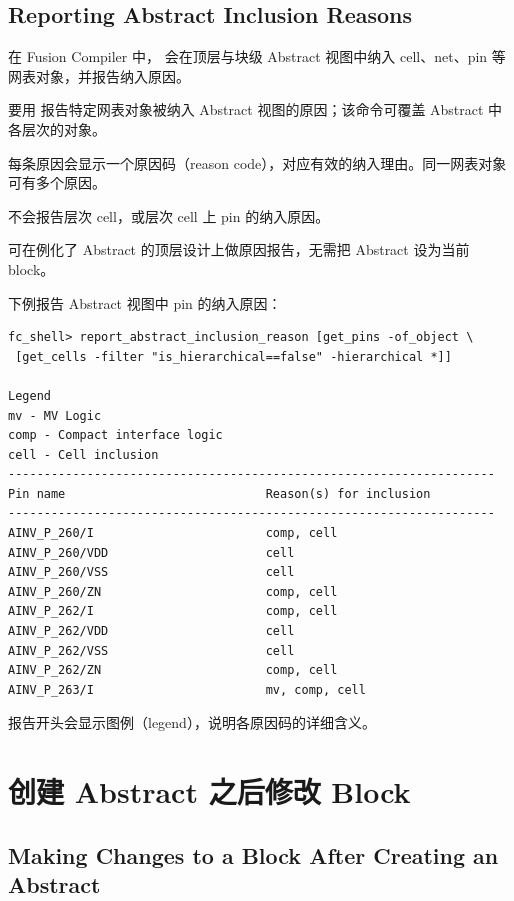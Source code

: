 \subsection*{Reporting Abstract Inclusion Reasons}

在 Fusion Compiler 中， 会在顶层与块级 Abstract 视图中纳入 cell、net、pin 等网表对象，并报告纳入原因。

要用  报告特定网表对象被纳入 Abstract 视图的原因；该命令可覆盖 Abstract 中各层次的对象。

每条原因会显示一个原因码（reason code），对应有效的纳入理由。同一网表对象可有多个原因。

\begin{noteBox}
 不会报告层次 cell，或层次 cell 上 pin 的纳入原因。
\end{noteBox}

可在例化了 Abstract 的顶层设计上做原因报告，无需把 Abstract 设为当前 block。

下例报告 Abstract 视图中 pin 的纳入原因：
\begin{lstlisting}
fc_shell> report_abstract_inclusion_reason [get_pins -of_object \
 [get_cells -filter "is_hierarchical==false" -hierarchical *]]

Legend
mv - MV Logic
comp - Compact interface logic
cell - Cell inclusion
--------------------------------------------------------------------
Pin name                            Reason(s) for inclusion
--------------------------------------------------------------------
AINV_P_260/I                        comp, cell
AINV_P_260/VDD                      cell
AINV_P_260/VSS                      cell
AINV_P_260/ZN                       comp, cell
AINV_P_262/I                        comp, cell
AINV_P_262/VDD                      cell
AINV_P_262/VSS                      cell
AINV_P_262/ZN                       comp, cell
AINV_P_263/I                        mv, comp, cell
\end{lstlisting}

报告开头会显示图例（legend），说明各原因码的详细含义。

\section{创建 Abstract 之后修改 Block}
\subsection*{Making Changes to a Block After Creating an Abstract}

